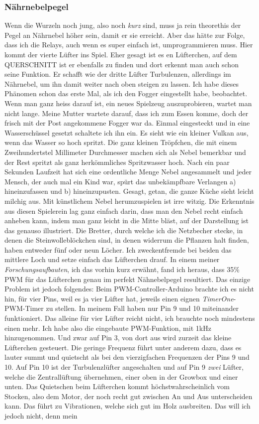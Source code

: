 \documentclass[12pt,titlepage,a4paper]{article}
\begin{document}
\subsubsection{Nährnebelpegel}
Wenn die Wurzeln noch jung, also noch \textit{kurz} sind, muss ja rein theorethis der Pegel an Nährnebel höher sein, damit er sie erreicht. Aber das hätte zur Folge, dass ich die Relays, auch wenn es super einfach ist, umprogrammieren muss. Hier kommt der vierte Lüfter ins Spiel. Eher gesagt ist es en Lüfterchen, auf dem QUERSCHNITT ist er ebenfalls zu finden und dort erkennt man auch schon seine Funktion. Er schafft wie der dritte Lüfter Turbulenzen, allerdings im Nährnebel, um ihn damit weiter nach oben steigen zu lassen. Ich habe dieses Phänomen schon das erste Mal, als ich den Fogger eingestellt habe, beobachtet. Wenn man ganz heiss darauf ist, ein neues Spielzeug auszuprobieren, wartet man nicht lange. Meine Mutter wartete darauf, dass ich zum Essen komme, doch der frisch mit der Post angekommene Fogger war da. Einmal eingesteckt und in eine Wasserschüssel gesetzt schaltete ich ihn ein. Es sieht wie ein kleiner Vulkan aus, wenn das Wasser so hoch spritzt. Die ganz kleinen Tröpfchen, die mit einem Zweihundertstel Millimeter Durchmesser machen sich als Nebel bemerkbar und der Rest spritzt als ganz herkömmliches Spritzwasser hoch. Nach ein paar Sekunden Laufzeit hat sich eine ordentliche Menge Nebel angesammelt und jeder Mensch, der auch mal ein Kind war, spürt das unbekämpfbare Verlangen a) hineinzufassen und b) hineinzupusten. Gesagt, getan, die ganze Küche sieht leicht milchig aus. Mit künstlichem Nebel herumzuspielen ist irre witzig. Die Erkenntnis aus diesen Spielerein lag ganz einfach darin, dass man den Nebel recht einfach anheben kann, indem man ganz leicht in die Mitte bläst, auf der Darstellung ist das genauso illustriert. Die Bretter, durch welche ich die Netzbecher stecke, in denen die Steinwolleblöckchen sind, in denen widerrum die Pflanzen halt finden, haben entweder fünf oder neun Löcher. Ich zweckentfremde  bei beiden das mittlere Loch und setze einfach das Lüfterchen drauf. In einem meiner \textit{Forschungsaufbauten}, ich das vorhin kurz erwähnt, fand ich heraus, dass 35\% PWM für das Lüfterchen genau im perfekt Nähnebelpegel resultiert. Das einzige Problem ist jedoch folgendes: Beim PWM-Controller-Arduino brachte ich es nicht hin, für vier Pins, weil es ja vier Lüfter hat, jeweils einen eignen \textit{TimerOne}-PWM-Timer zu stellen. In meinem Fall haben nur Pin 9 und 10 miteinander funktioniert. Das alleine für vier Lüfter reicht nicht, ich brauchte noch mindestens einen mehr. Ich habe also die eingebaute PWM-Funktion, mit 1kHz hinzugenommen. Und zwar auf Pin 3, von dort aus wird zurzeit das kleine Lüfterchen gesteuert. Die geringe Frequenz führt unter anderem dazu, dass es lauter summt und quietscht als bei den vierzigfachen Frequenzen der Pins 9 und 10. Auf Pin 10 ist der Turbulenzlüfter angeschalten und auf Pin 9 \textit{zwei} Lüfter, welche die Zentrallüftung übernehmen, einer oben in der Growbox und einer unten. Das Quietschen beim Lüfterchen kommt höchstwahrscheinlich vom Stocken, also dem Motor, der noch recht gut zwischen An und Aus unterscheiden kann. Das führt zu Vibrationen, welche sich gut im Holz ausbreiten. Das will ich jedoch nicht, denn mein 
\end{document}
